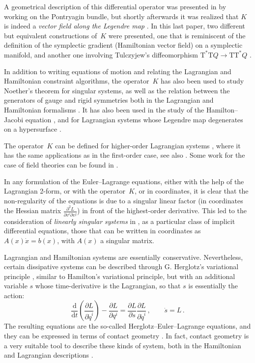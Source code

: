 \documentclass[11pt]{article}
\theoremstyle{plain}
\theoremstyle{definition}
\renewcommand{\d}{\mathrm{d}}
\newcommand{\T}{{\mathrm T}}
\newcommand{\parderr}[3]{\frac{\partial^2 #1}{\partial #2\partial #3}}
\def\d{\mathrm{d}}
\def\d{\mathrm{d}}
\begin{document}
A geometrical description of this differential operator was presented in
\cite{CL_87}
by working on the Pontryagin bundle,
but shortly afterwards it was realized that
$K$ is indeed a 
\textsl{vector field along the Legendre map} 
\cite{GP_89}. In this last paper, two different but equivalent constructions of~$K$ 
were presented,
one that is reminiscent of 
the definition of the symplectic gradient (Hamiltonian vector field) on a symplectic manifold,
and another one involving
Tulczyjew's diffeomorphism
$\T^* \T Q \to \T \T^*Q$
\cite{Tul_1976b}.

In addition to writing equations of motion and relating the Lagrangian and Hamiltonian constraint algorithms,
the operator~$K$ has also been used to study Noether's theorem for singular systems,
as well as the relation between the generators of gauge and rigid symmetries both
in the Lagrangian and Hamiltonian formalisms
\cite{GraPon_1994,GraPon_1988,GP_92a,GraPon_2000,GraPon_2001}.
It has also been used in the study of the Hamilton--Jacobi equation \cite{CGMMMR_2009}, 
and for Lagrangian systems whose Legendre map degenerates on a hypersurface
\cite{PV_00}.

The operator~$K$ can be defined for higher-order Lagrangian systems
\cite{BGPR_1988,CL_92,GPR_91},
where it has the same applications as in the first-order case,
see also
\cite{GraPon_1995,GPR_92}. Some work for the case of field theories can be found in
\cite{EMMR_03,RRS_05}.

In any formulation of the Euler--Lagrange equations, 
either 
with the help of the Lagrangian 2-form,
or with the operator~$K$,
or in coordinates,
it is clear that the non-regularity of the equations 
is due to a singular linear factor
(in coordinates the Hessian matrix 
$\parderr{L}{v^i}{v^j}$)
in front of the highest-order derivative.
This led to the consideration of 
\textsl{linearly singular systems} in
\cite{GP_92},
as a particular class of implicit differential equations,
those that can be written in coordinates as
$A(x) \dot x = b(x)$,
with $A(x)$ a singular matrix.

Lagrangian and Hamiltonian systems are essentially conservative.
Nevertheless, 
certain dissipative systems can be described through
G. Herglotz's variational principle 
\cite{Her_30,Her_85},
similar to Hamilton's variational principle,
but with an additional variable $s$ whose time-derivative is the Lagrangian, so that $s$ is essentially the action:
$$
\frac {\d}{\d t} 
\left( \frac {\partial L}{\partial \dot q^i} \right) - 
\frac {\partial L}{\partial q^i}
=
\frac {\partial L}{\partial s} 
\frac {\partial L}{\partial \dot q^i}
\,,
\qquad 
\dot s = L
\,.
$$
The resulting equations are the so-called Herglotz--Euler--Lagrange equations, and they can be expressed in terms of contact geometry
\cite{BH_16,BGG_17,Gei_08}.
In fact, contact geometry is a very suitable tool to describe these kinds of system,
both in the Hamiltonian \cite{Bra_17,BCT_17,BLMP_20,CG_19,LL_19,LS_17,GG_22} and Lagrangian descriptions \cite{CCM_18,LL_19a,GGMRR_20a,MR_18}. 
\end{document}
